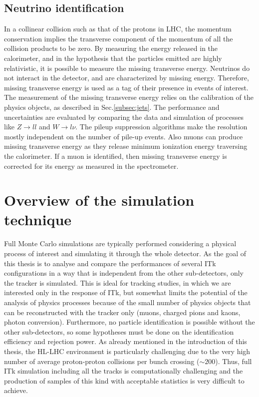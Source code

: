 \documentclass[a4paper,twoside,12pt]{book}
\begin{document}
\section{Neutrino identification}
In a collinear collision such as that of the protons in LHC, the momentum conservation 
implies the transverse component of the momentum of all the collision products to be zero. 
By measuring the energy released in the calorimeter, and in the hypothesis that the particles emitted are highly relativistic, it is possible to measure the missing transverse energy. Neutrinos do not interact in the detector, and are characterized by missing energy. Therefore, 
missing transverse energy is used as a tag of their presence in events of interest. The measurement of the missing transverse energy relies on the calibration of the 
physics objects, as described in Sec.\ref{subsec:jets}. The performance and uncertainties are 
evaluated by comparing the data and simulation of processes like $Z \rightarrow ll$ and 
$W \rightarrow l\nu$. The pileup suppression algorithms make the resolution mostly independent on
the number of pile-up events. Also muons can produce missing transverse energy as they release minimum 
ionization energy traversing the calorimeter. If a muon is identified, then missing transverse energy is
corrected for its energy as measured in the spectrometer.

\clearpage

\chapter{Overview of the simulation technique}\label{sec:simulation}
Full Monte Carlo simulations are typically performed considering 
a physical process of interest and simulating it through the whole detector. As the goal of this
thesis is to analyse and compare the performances of several ITk configurations in a way that
is independent from the other sub-detectors, only the tracker is simulated. This is 
ideal for tracking studies, in which we are interested only in the response of ITk, but
somewhat 
limits the potential of the analysis of physics processes because of the small number of physics objects that can be reconstructed with the tracker only (muons, charged pions and kaons, photon conversion). Furthermore, no particle identification is possible without the other sub-detectors, so some
 hypotheses must be done on the identification efficiency and rejection power.
As already mentioned in the introduction of this thesis, the HL-LHC environment is particularly
challenging due to the very high number of average proton-proton collisions per bunch crossing ($\sim 200$). Thus, full ITk simulation including all the tracks is computationally challenging 
and the production of samples of this kind with acceptable statistics is very difficult
to achieve.\\
\end{document}
